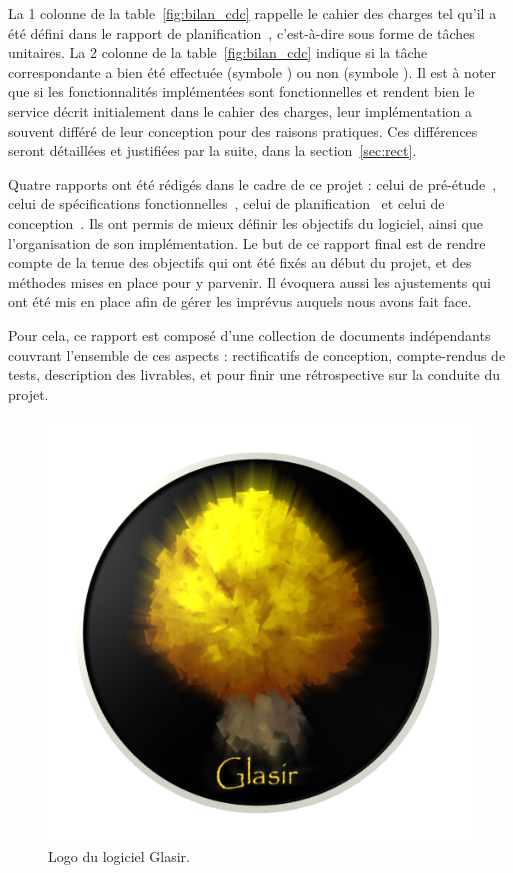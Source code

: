     La 1\iere{} colonne de la {\sc table}~\ref{fig:bilan_cdc} rappelle le cahier des charges tel qu'il a été défini dans le rapport de planification~\cite{planif}, c'est-à-dire sous forme de tâches unitaires. La 2\ieme{} colonne de la {\sc table}~\ref{fig:bilan_cdc} indique si la tâche correspondante a bien été effectuée (symbole \textcolor{bo_vert}{}) ou non (symbole \textcolor{red}{}). Il est à noter que si les fonctionnalités implémentées sont fonctionnelles et rendent bien le service décrit initialement dans le cahier des charges, leur implémentation a souvent différé de leur conception pour des raisons pratiques. Ces différences seront détaillées et justifiées par la suite, dans la {\sc section}~\ref{sec:rect}.

    Quatre rapports ont été rédigés dans le cadre de ce projet : celui de pré-étude~\cite{pre_etude}, celui de spécifications fonctionnelles~\cite{spec_fonc}, celui de planification~\cite{planif} et celui de conception~\cite{conception}. Ils ont permis de mieux définir les objectifs du logiciel, ainsi que l'organisation de son implémentation. Le but de ce rapport final est de rendre compte de la tenue des objectifs qui ont été fixés au début du projet, et des méthodes mises en place pour y parvenir. Il évoquera aussi les ajustements qui ont été mis en place afin de gérer les imprévus auquels nous avons fait face. 

    Pour cela, ce rapport est composé d'une collection de documents indépendants couvrant l'ensemble de ces aspects : rectificatifs de conception, compte-rendus de tests, description des livrables, et pour finir une rétrospective sur la conduite du projet.

    \vspace{4mm}

    \begin{figure}[!h]
        \centering
        \includegraphics[height=0.5\textwidth]{figure/glasir.png}
        \caption{Logo du logiciel Glasir.}
        \label{fig:glasir}
    \end{figure}